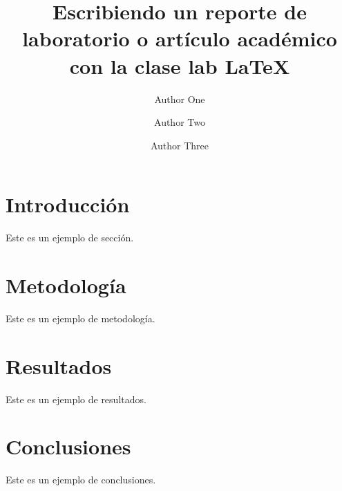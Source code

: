 \documentclass[9pt,a4paper,twocolumn,twoside]{lab-class/lab}
\title{Escribiendo un reporte de laboratorio o artículo académico con la clase lab \LaTeX}
\author[a,1]{Author One}
\author[b,2]{Author Two}
\author[b,c,3]{Author Three}
\affil[a]{Affiliation of author one}
\affil[b]{Affiliation of author two}
\affil[c]{Affiliation of author three}
\begin{document}
    \maketitle 
    \thispagestyle{firststyle} 
    \lababstract 
    

\section{Introducción}
Este es un ejemplo de sección.

\section{Metodología}
Este es un ejemplo de metodología.

\section{Resultados}
Este es un ejemplo de resultados.

\section{Conclusiones}
Este es un ejemplo de conclusiones.
\end{document}
